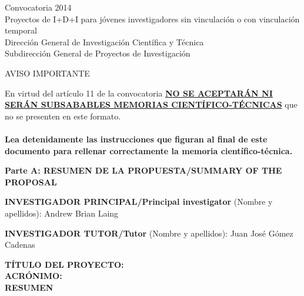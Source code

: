 \documentclass[a4paper,11pt,oneside]{article}
\begin{document}


\begin{tcolorbox}[colback=white,arc=0pt,outer arc=0pt,colframe=black,boxrule=0.6pt]
  \begin{center}
    Convocatoria 2014\\
    Proyectos de I+D+I para j\'ovenes investigadores sin vinculaci\'on o con vinculaci\'on temporal\\
    Direcci\'on General de Investigaci\'on Cient\'ifica y T\'ecnica\\
    Subdirecci\'on General de Proyectos de Investigaci\'on
  \end{center}
\end{tcolorbox}
\begin{tcolorbox}[colback=yellow,arc=0pt,outer arc=0pt,colframe=black,boxrule=0.6pt,left=0mm,right=0mm]
  \begin{center}
    AVISO IMPORTANTE\\
  \end{center}
    En virtud del art\'iculo 11 de la convocatoria \ul{\textbf{NO SE ACEPTAR\'AN NI SER\'AN SUBSABABLES MEMORIAS CIENT\'IFICO-T\'ECNICAS}} que no se presenten en este formato.\\
    \\
    \textbf{Lea detenidamente las instrucciones que figuran al final de este documento para rellenar correctamente la memoria cient\'ifico-t\'ecnica.}
    \\
\end{tcolorbox}
\vspace{3pt}
\begin{tcolorbox}[colback=yellow,arc=0pt,outer arc=0pt,colframe=black,boxrule=0.6pt,left=0mm]
  \textbf{Parte A: RESUMEN DE LA PROPUESTA/SUMMARY OF THE PROPOSAL}
\end{tcolorbox}

\vspace{12pt}

\noindent\textbf{INVESTIGADOR PRINCIPAL/Principal investigator} (Nombre y apellidos): Andrew Brian Laing\\
\vspace{12pt}

\noindent\textbf{INVESTIGADOR TUTOR/Tutor} (Nombre y apellidos): Juan Jos\'e G\'omez Cadenas\\
\vspace{24pt}

\noindent\textbf{T\'ITULO DEL PROYECTO:}\\
\textbf{ACR\'ONIMO:}\\
\textbf{RESUMEN} {\color{blue}{M\'aximo 3500 caracteres (incluyendo espacios en blanco):}}
\vspace{12pt}
\end{document}
